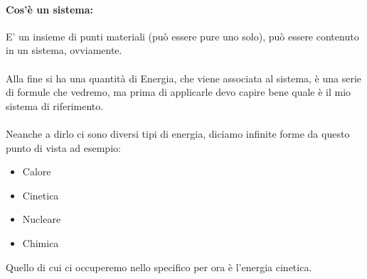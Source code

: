 \documentclass[12pt, a4paper, openany, oneside]{book}
\begin{document}
\paragraph{Cos'è un sistema: } E' un insieme di punti materiali (può essere 
pure uno solo), può essere contenuto in un sistema, ovviamente.
\\ \\
Alla fine si ha una quantità di Energia, che viene associata al sistema, è
una serie di formule che vedremo, ma prima di applicarle devo capire bene quale
è il mio sistema di riferimento.\\ \\
Neanche a dirlo ci sono diversi tipi di energia, diciamo infinite forme da questo
punto di vista ad esempio:
\begin{itemize}
	\item Calore
	\item Cinetica
	\item Nucleare
	\item Chimica
\end{itemize}
Quello di cui ci occuperemo nello specifico per ora è l'energia cinetica.
\end{document}
